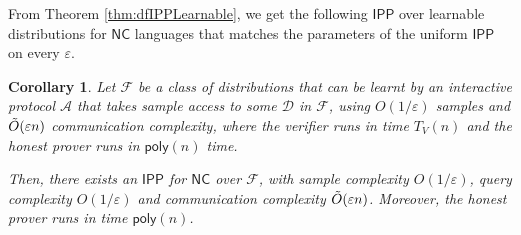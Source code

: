 \documentclass[11pt]{article}
\newtheorem{corollary}[theorem]{Corollary}
\newcommand{\poly}{\mathsf{poly}}
\newcommand{\NC}{\mathsf{NC}}
\newcommand{\IPP}{\mathsf{IPP}}
\newcommand{\sD}{\mathcal{D}}
\newcommand{\sF}{\mathcal{F}}
\newcommand{\sA}{\mathcal{A}}
\begin{document}
\noindent From Theorem \ref{thm:dfIPPLearnable}, we get the following $\IPP$ over learnable distributions for $\NC$ languages that matches the parameters of the uniform $\IPP$ on every $\varepsilon$.
\begin{corollary}
\label{cor:learnable_nc_improvement}
Let $\sF$ be a class of distributions that can be learnt by an interactive protocol $\sA$ that takes sample access to some $\sD$ in $\sF$, using $O(1/\varepsilon)$ samples and $\Tilde{O}(\varepsilon n)$ communication complexity, where the verifier runs in time $T_V(n)$ and the honest prover runs in $\poly(n)$ time. 
     
Then, there exists an $\IPP$ for $\NC$ over $\sF$, with sample complexity $O(1/\varepsilon)$, query complexity $O(1/\varepsilon)$ and communication complexity $\Tilde{O}(\varepsilon n)$. Moreover, the honest prover runs in time $\poly(n)$.
\end{corollary}
\end{document}
